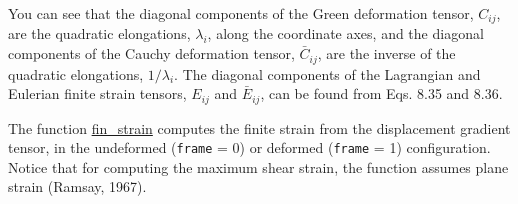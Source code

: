\documentclass[a4paper , 12pt]{book}
\newcommand{\code}[1]{\colorbox{light-gray}{\texttt{#1}}}
\begin{document}
You can see that the diagonal components of the Green deformation tensor, $C_{ij}$, are the quadratic elongations, $\lambda_i$, along the coordinate axes, and the diagonal components of the Cauchy deformation tensor, $\bar{C}_{ij}$, are the inverse of the quadratic elongations, $1/\lambda_i$. The diagonal components of the Lagrangian and Eulerian finite strain tensors, $E_{ij}$ and $\bar{E}_{ij}$, can be found from Eqs. 8.35 and 8.36.

The function \href{https://github.com/nfcd/compGeo/blob/master/source/functions/fin_strain.py}{fin\_strain} computes the finite strain from the displacement gradient tensor, in the undeformed (\code{frame} = 0) or deformed (\code{frame} = 1) configuration. Notice that for computing the maximum shear strain, the function assumes plane strain (Ramsay, 1967).
\end{document}
